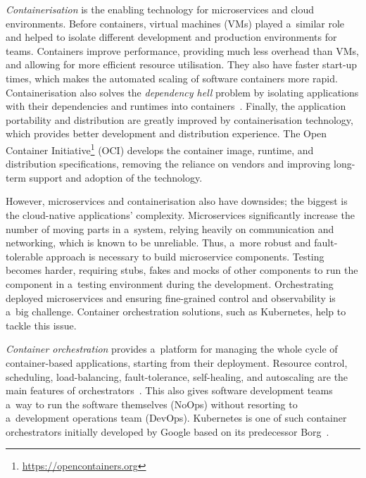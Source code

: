 \documentclass[12pt]{article}
\begin{document}
\emph{Containerisation} is the enabling technology for microservices and cloud environments. Before containers, virtual machines (VMs) played a~similar role and helped to isolate different development and production environments for teams. Containers improve performance, providing much less overhead than VMs, and allowing for more efficient resource utilisation. They also have faster start-up times, which makes the automated scaling of software containers more rapid. Containerisation also solves the \emph{dependency hell} problem by isolating applications with their dependencies and runtimes into containers~\cite{puliafito_container_2019}. Finally, the application portability and distribution are greatly improved by containerisation technology, which provides better development and distribution experience. The Open Container Initiative\footnote{\href{https://opencontainers.org}{https://opencontainers.org}} (OCI) develops the container image, runtime, and distribution specifications, removing the reliance on vendors and improving long-term support and adoption of the technology.

However, microservices and containerisation also have downsides; the biggest is the cloud-native applications' complexity. Microservices significantly increase the number of moving parts in a~system, relying heavily on communication and networking, which is known to be unreliable. Thus, a~more robust and fault-tolerable approach is necessary to build microservice components. Testing becomes harder, requiring stubs, fakes and mocks of other components to run the component in a~testing environment during the development. Orchestrating deployed microservices and ensuring fine-grained control and observability is a~big challenge. Container orchestration solutions, such as Kubernetes, help to tackle this issue.

\emph{Container orchestration} provides a~platform for managing the whole cycle of container-based applications, starting from their deployment. 
Resource control, scheduling, load-balancing, fault-tolerance, self-healing, and autoscaling are the main features of orchestrators~\cite{puliafito_container_2019}. 
This also gives software development teams a~way to run the software themselves (NoOps) without resorting to a~development operations team (DevOps).
Kubernetes is one of such container orchestrators initially developed by Google based on its predecessor Borg~\cite{verma_large-scale_2015}. 
\end{document}
